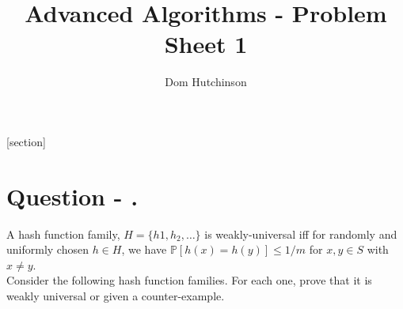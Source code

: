 \documentclass[11pt,a4paper]{article}
\begin{document}
\pagestyle{fancy}
\setlength\parindent{0pt}
\allowdisplaybreaks

\renewcommand{\headrulewidth}{0pt}

\title{Advanced Algorithms - Problem Sheet 1}
\author{Dom Hutchinson}
\maketitle

\fancyhead[R]{\today}

[section]

\newcommand{\dotprod}[0]{\boldsymbol{\cdot}}
\newcommand{\cosech}[0]{\mathrm{cosech}\ }
\newcommand{\cosec}[0]{\mathrm{cosec}\ }
\newcommand{\sech}[0]{\mathrm{sech}\ }
\newcommand{\prob}[0]{\mathbb{P}}
\newcommand{\nats}[0]{\mathbb{N}}
\newcommand{\cov}[0]{\mathrm{cov}}
\newcommand{\var}[0]{\mathrm{var}}
\newcommand{\expect}[0]{\mathbb{E}}
\newcommand{\reals}[0]{\mathbb{R}}
\newcommand{\integers}[0]{\mathbb{Z}}
\newcommand{\indicator}[0]{\mathds{1}}
\newcommand{\nb}[0]{\textit{N.B.} }
\newcommand{\ie}[0]{\textit{i.e.} }
\newcommand{\eg}[0]{\textit{e.g.} }
\newcommand{\iid}[0]{\overset{\text{iid}}{\sim} }
\newcommand{\x}[0]{\textbf{x} }
\newcommand{\X}[0]{\textbf{X} }
\newcommand{\Mod}[0]{\text{ mod }}
\newcommand{\proved}[0]{$\hfill\square$}

\newcommand{\qpart}[0]{\stepcounter{qpart} \textbf{Question \arabic{section} \alph{qpart})\\}}
\newcommand{\qpartnb}[0]{\stepcounter{qpart} \textbf{Question \arabic{section} \alph{qpart})} - }
\newcommand{\ans}[0]{ \textbf{Answer \arabic{section}\\}}
\newcommand{\apart}[0]{ \textbf{Answer \arabic{section} \alph{qpart})\\}}
\newcommand{\apartnb}[0]{\stepcounter{qpart} \textbf{Answer \arabic{section} \alph{qpart})}}
\newcommand{\question}[0]{\section*{Question - .}}

\question
A hash function family, $H=\{h1,h_2,\dots\}$ is weakly-universal iff for randomly and uniformly chosen $h\in H$, we have $\prob[h(x)=h(y)]\leq1/m$ for $x,y\in S$ with $x\neq y$.\\
Consider the following hash function families. For each one, prove that it is weakly universal or given a counter-example.\\
\end{document}
